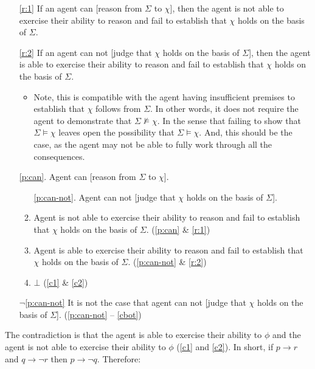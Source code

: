 \documentclass[10pt]{article}
\begin{document}
\begin{enumerate}
\item[\ref{r:1}] If an agent can [reason from \(\Sigma\) to \(\chi\)], then the agent is not able to exercise their ability to reason and fail to establish that \(\chi\) holds on the basis of \(\Sigma\).
\item[\ref{r:2}] If an agent can not [judge that \(\chi\) holds on the basis of \(\Sigma\)], then the agent is able to exercise their ability to reason and fail to establish that \(\chi\) holds on the basis of \(\Sigma\).
  \begin{itemize}
  \item {
      \color{red}
      Note, this is compatible with the agent having insufficient premises to establish that \(\chi\) follows from \(\Sigma\).
      In other words, it does not require the agent to demonstrate that \(\Sigma \nvDash \chi\).
      In the sense that failing to show that \(\Sigma \vDash \chi\) leaves open the possibility that \(\Sigma \vDash \chi\).
      And, this should be the case, as the agent may not be able to fully work through all the consequences.
    }
  \end{itemize}
\item[\ref{p:can}.] Agent can [reason from \(\Sigma\) to \(\chi\)].
  \begin{enumerate}[ref=\alph*.]
  \item[\ref{p:can-not}.] Agent can not [judge that \(\chi\) holds on the basis of \(\Sigma\)].
  \item\label{c1} Agent is not able to exercise their ability to reason and fail to establish that \(\chi\) holds on the basis of \(\Sigma\). \hfill (\ref{p:can} \& \ref{r:1})
  \item\label{c2} Agent is able to exercise their ability to reason and fail to establish that \(\chi\) holds on the basis of \(\Sigma\). \hfill (\ref{p:can-not} \& \ref{r:2})
  \item\label{cbot} \(\bot\) (\ref{c1} \& \ref{c2})
  \end{enumerate}
\item[\(\lnot\)\ref{p:can-not}] It is not the case that agent can not [judge that \(\chi\) holds on the basis of \(\Sigma\)]. \hfill (\ref{p:can-not} -- \ref{cbot})
\end{enumerate}

The contradiction is that the agent is able to exercise their ability to \(\phi\) and the agent is not able to exercise their ability to \(\phi\) (\ref{c1} and \ref{c2}).
In short, if \(p \rightarrow r\) and \(q \rightarrow \lnot r\) then \(p \rightarrow \lnot q\).
Therefore:
\end{document}
